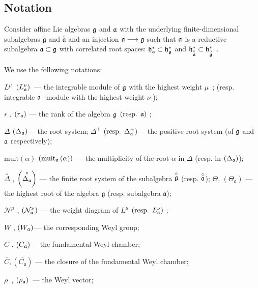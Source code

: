 \documentclass[12pt]{iopart}
\newcommand{\go}{\stackrel{\circ }{\mathfrak{g}}}
\newcommand{\ao}{\stackrel{\circ }{\mathfrak{a}}}
\newcommand{\co}[1]{\stackrel{\circ }{#1}}
\begin{document}
\subsection{Notation}
\label{sec:notation}

Consider affine Lie algebras $\frak{g}$ and $\frak{a}$ with the
underlying finite-dimensional subalgebras $\go$ and $%
\ao$ and an injection $\frak{a}\longrightarrow \frak{g%
}$ such that $\frak{a}$ is a reductive subalgebra $\frak{a\subset g}$ with
correlated root spaces: $\frak{h}_{\frak{a}}^{\ast }\subset \frak{h}_{\frak{g%
}}^{\ast }$ and $\frak{h}_{\ao}^{\ast }\subset \frak{h%
}_{\go}^{\ast }$\ .

We use the following notations:

$L^{\mu }$\ $\left( L_{\frak{a}}^{\nu }\right) $\ --- the integrable module
of $\frak{g}$ with the highest weight $\mu $\ ; (resp. integrable $\frak{a}$
-module with the highest weight $\nu $ );

$r$ , $\left( r_{\frak{a}}\right) $ --- the rank of the algebra $\frak{g}$ $%
\left( \mbox{resp. }\frak{a}\right) $ ;

$\Delta $ $\left( \Delta _{\frak{a}}\right) $--- the root system; $\Delta
^{+} $ $\left( \mbox{resp. }\Delta _{\frak{a}}^{+}\right) $--- the positive
root system (of $\frak{g}$ and $\frak{a}$ respectively);

$\mathrm{mult}\left( \alpha \right) $ $\left( \mathrm{mult}_{\frak{a}}\left(
\alpha \right) \right) $ --- the multiplicity of the root $\alpha$ in $\Delta
$ (resp. in $\left( \Delta _{\frak{a}}\right) $);

$\co{\Delta}$ , $\left( \co{\Delta _{\frak{a}}}%
\right)$ --- the finite root system of the subalgebra $\co{%
\frak{g}}$ (resp. $\co{\frak{a}}$);
$\Theta$, $(\Theta_{\mathfrak{a}})$ --- the highest root of the algebra $\mathfrak{g}$ (resp. subalgebra $\mathfrak{a}$);

$\mathcal{N}^{\mu }$ , $\left( \mathcal{N}_{\frak{a}}^{\nu }\right) $ --- the
weight diagram of $L^{\mu }$ $\left( \mbox{resp. }L_{\frak{a}}^{\nu }\right)
$ ;

$W$ , $\left( W_{\frak{a}}\right) $--- the corresponding Weyl group;

$C$ , $\left( C_{\frak{a}}\right) $--- the fundamental Weyl chamber;

$\bar{C}, \left(\bar{C_{\mathfrak{a}}}\right)$ --- the closure of the fundamental Weyl chamber;

$\rho $\ , $\left( \rho _{\frak{a}}\right) $\ --- the Weyl vector;
\end{document}
